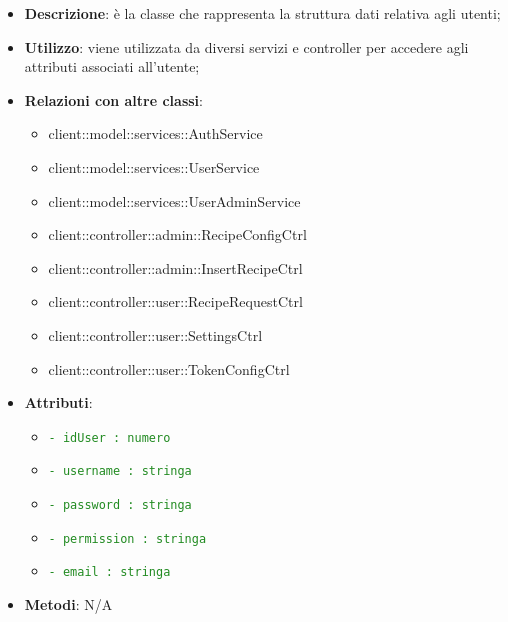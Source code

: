 			\begin{itemize}
				\item \textbf{Descrizione}: è la classe che rappresenta la struttura dati relativa agli utenti;
				\item \textbf{Utilizzo}: viene utilizzata da diversi servizi e controller per accedere agli attributi associati all'utente;
				\item \textbf{Relazioni con altre classi}:
					\begin{itemize}
						\item client::model::services::AuthService
						\item client::model::services::UserService
						\item client::model::services::UserAdminService
						\item client::controller::admin::RecipeConfigCtrl
						\item client::controller::admin::InsertRecipeCtrl
						\item client::controller::user::RecipeRequestCtrl
						\item client::controller::user::SettingsCtrl
						\item client::controller::user::TokenConfigCtrl
					\end{itemize}
				\item \textbf{Attributi}:
					\begin{itemize}
						\item \textcolor{forestgreen}{\texttt{- idUser : numero}}
						\item \textcolor{forestgreen}{\texttt{- username : stringa}}
						\item \textcolor{forestgreen}{\texttt{- password : stringa}}
						\item \textcolor{forestgreen}{\texttt{- permission : stringa}}
						\item \textcolor{forestgreen}{\texttt{- email : stringa}}
					\end{itemize}
				\item \textbf{Metodi}: N/A
			\end{itemize}

